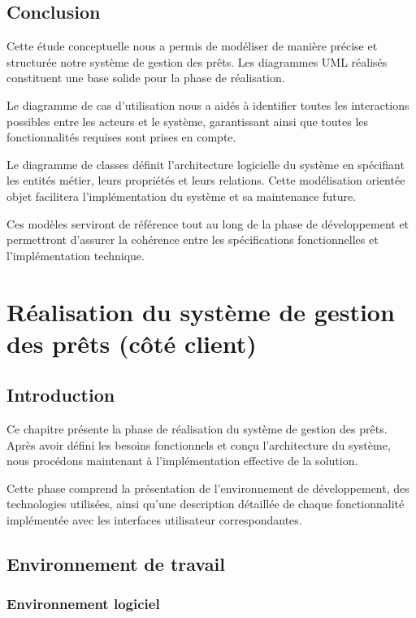 \documentclass[12pt,a4paper]{report}
\begin{document}
\section{Conclusion}

Cette étude conceptuelle nous a permis de modéliser de manière précise et structurée notre système de gestion des prêts. Les diagrammes UML réalisés constituent une base solide pour la phase de réalisation.

Le diagramme de cas d'utilisation nous a aidés à identifier toutes les interactions possibles entre les acteurs et le système, garantissant ainsi que toutes les fonctionnalités requises sont prises en compte.

Le diagramme de classes définit l'architecture logicielle du système en spécifiant les entités métier, leurs propriétés et leurs relations. Cette modélisation orientée objet facilitera l'implémentation du système et sa maintenance future.

Ces modèles serviront de référence tout au long de la phase de développement et permettront d'assurer la cohérence entre les spécifications fonctionnelles et l'implémentation technique.

\newpage

\chapter{Réalisation du système de gestion des prêts (côté client)}

\section{Introduction}

Ce chapitre présente la phase de réalisation du système de gestion des prêts. Après avoir défini les besoins fonctionnels et conçu l'architecture du système, nous procédons maintenant à l'implémentation effective de la solution.

Cette phase comprend la présentation de l'environnement de développement, des technologies utilisées, ainsi qu'une description détaillée de chaque fonctionnalité implémentée avec les interfaces utilisateur correspondantes.

\section{Environnement de travail}

\subsection{Environnement logiciel}
\end{document}
